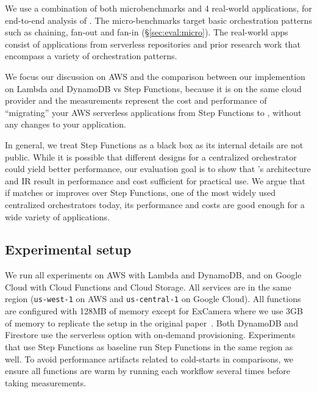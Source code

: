 


We use a combination of both microbenchmarks and 4 real-world applications,
for end-to-end analysis of \name{}. The micro-benchmarks target basic
orchestration patterns such as chaining, fan-out and fan-in
(\S\ref{sec:eval:micro}). The real-world apps consist of applications from
serverless repositories and prior research work that encompass a variety of
orchestration patterns.

We focus our discussion on AWS and the comparison between our \name{}
implemention on Lambda and DynamoDB vs Step Functions, because it is on the
same cloud provider and the measurements represent the cost and performance of
``migrating'' your AWS serverless applications from Step Functions to \name{},
without any changes to your application. 

In general, we treat Step Functions as a black box as its internal details are
not public. While it is possible that different designs for a centralized
orchestrator could yield better performance, our evaluation goal is to show
that \name{}'s architecture and IR result in performance and cost sufficient
for practical use. We argue that if \name{} matches or improves over Step
Functions, one of the most widely used centralized orchestrators today, its
performance and costs are good enough for a wide variety of applications.

\subsection{Experimental setup}

We run all experiments on AWS with Lambda and DynamoDB, and on Google Cloud
with Cloud Functions and Cloud Storage. All services are in the same region
(\texttt{us-west-1} on AWS and \texttt{us-central-1} on Google Cloud). All
functions are configured with 128MB of memory except for ExCamera where we use
3GB of memory to replicate the setup in the original paper~\cite{excamera,
gg-atc}. Both DynamoDB and Firestore use the serverless option with on-demand
provisioning. Experiments that use Step Functions as baseline run Step
Functions in the same region as well. To avoid performance artifacts related
to cold-starts in comparisons, we ensure all functions are warm by running
each workflow several times before taking measurements.


